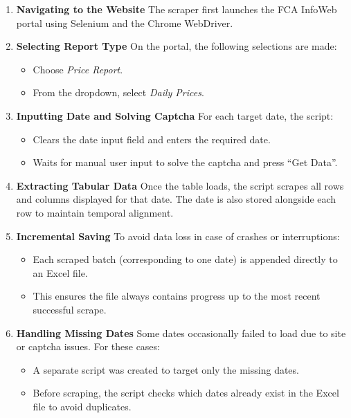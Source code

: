 \documentclass[12pt]{article}
\begin{document}
\begin{enumerate}[label=\textbf{Step \arabic*:}, leftmargin=*]

\item \textbf{Navigating to the Website}  
The scraper first launches the FCA InfoWeb portal using Selenium and the Chrome WebDriver.  

\item \textbf{Selecting Report Type}  
On the portal, the following selections are made:
\begin{itemize}
    \item Choose \emph{Price Report}.
    \item From the dropdown, select \emph{Daily Prices}.
\end{itemize}

\item \textbf{Inputting Date and Solving Captcha}  
For each target date, the script:
\begin{itemize}
    \item Clears the date input field and enters the required date.
    \item Waits for manual user input to solve the captcha and press ``Get Data''.
\end{itemize}

\item \textbf{Extracting Tabular Data}  
Once the table loads, the script scrapes all rows and columns displayed for that date.  
The date is also stored alongside each row to maintain temporal alignment.

\item \textbf{Incremental Saving}  
To avoid data loss in case of crashes or interruptions:
\begin{itemize}
    \item Each scraped batch (corresponding to one date) is appended directly to an Excel file.
    \item This ensures the file always contains progress up to the most recent successful scrape.
\end{itemize}

\item \textbf{Handling Missing Dates}  
Some dates occasionally failed to load due to site or captcha issues.  
For these cases:
\begin{itemize}
    \item A separate script was created to target only the missing dates.
    \item Before scraping, the script checks which dates already exist in the Excel file 
    to avoid duplicates.
\end{itemize}


\end{enumerate}
\end{document}
